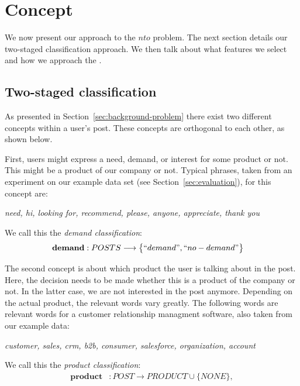 \section{Concept}
\label{sec:concept}

We now present our approach to the $nto$ problem.
The next section details our two-staged classification approach.
We then talk about what features we select and how we approach the \emph{\documentmismatch}.

\subsection{Two-staged classification}
As presented in Section~\ref{sec:background-problem} there exist two different concepts within a user's post.
These concepts are orthogonal to each other, as shown below.

First, users might express a need, demand, or interest for some product or not.
This might be a product of our company or not.
Typical phrases, taken from an experiment on our example data set (see Section~\ref{sec:evaluation}), for this concept are:
\begin{center}
	\textit{need, hi, looking for, recommend, please, anyone, appreciate, thank you}
\end{center}
We call this the \emph{demand classification}:
\begin{align}
	\mathbf{demand}&: POSTS \longrightarrow \big\{ ``demand", ``no-demand" \big\}
\end{align}

The second concept is about which product the user is talking about in the post.
Here, the decision needs to be made whether this is a product of the company or not.
In the latter case, we are not interested in the post anymore.
Depending on the actual product, the relevant words vary greatly.
The following words are relevant words for a customer relationship managment software, also taken from our example data:
\begin{center}
	\textit{customer, sales, crm, b2b, consumer, salesforce, organization, account}
\end{center}

We call this the \emph{product classification}:
\begin{align}
	\mathbf{product}&: POST \longrightarrow  PRODUCT \cup \big\{ NONE \big\}, \\
\end{align}

